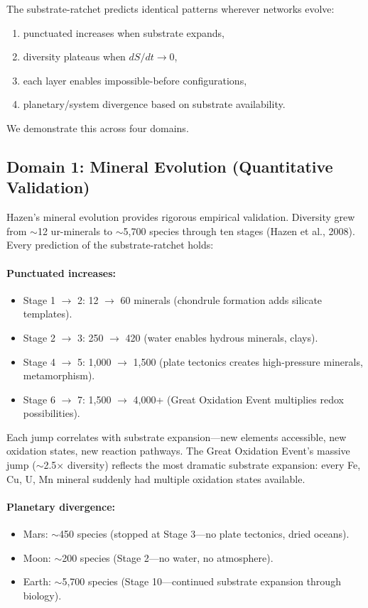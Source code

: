 \documentclass[12pt,a4paper]{article}
\begin{document}
The substrate-ratchet predicts identical patterns wherever networks evolve:
\begin{enumerate}
    \item punctuated increases when substrate expands,
    \item diversity plateaus when $dS/dt \rightarrow 0$,
    \item each layer enables impossible-before configurations,
    \item planetary/system divergence based on substrate availability.
\end{enumerate}

We demonstrate this across four domains.

\subsection{Domain 1: Mineral Evolution (Quantitative Validation)}

Hazen's mineral evolution provides rigorous empirical validation. Diversity grew from $\sim$12 ur-minerals to $\sim$5{,}700 species through ten stages (Hazen et al., 2008). Every prediction of the substrate-ratchet holds:

\paragraph{Punctuated increases:}
\begin{itemize}
    \item Stage 1 $\rightarrow$ 2: 12 $\rightarrow$ 60 minerals (chondrule formation adds silicate templates).
    \item Stage 2 $\rightarrow$ 3: 250 $\rightarrow$ 420 (water enables hydrous minerals, clays).
    \item Stage 4 $\rightarrow$ 5: 1{,}000 $\rightarrow$ 1{,}500 (plate tectonics creates high-pressure minerals, metamorphism).
    \item Stage 6 $\rightarrow$ 7: 1{,}500 $\rightarrow$ 4{,}000+ (Great Oxidation Event multiplies redox possibilities).
\end{itemize}

Each jump correlates with substrate expansion---new elements accessible, new oxidation states, new reaction pathways. The Great Oxidation Event's massive jump ($\sim$2.5$\times$ diversity) reflects the most dramatic substrate expansion: every Fe, Cu, U, Mn mineral suddenly had multiple oxidation states available.

\paragraph{Planetary divergence:}
\begin{itemize}
    \item Mars: $\sim$450 species (stopped at Stage 3---no plate tectonics, dried oceans).
    \item Moon: $\sim$200 species (Stage 2---no water, no atmosphere).
    \item Earth: $\sim$5{,}700 species (Stage 10---continued substrate expansion through biology).
\end{itemize}
\end{document}

